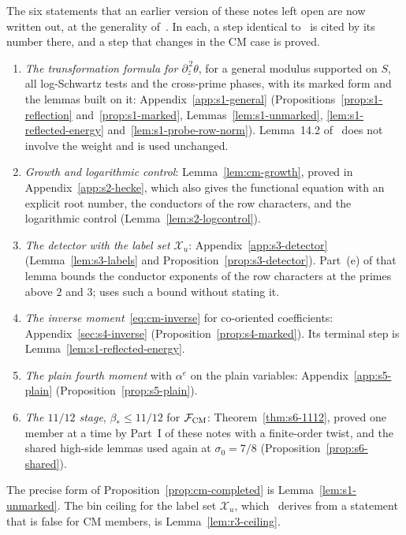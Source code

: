 \documentclass[11pt]{article}
\numberwithin{equation}{section}
\begin{document}
The six statements that an earlier version of these notes left open are now written out, at the
generality of~\cite{OAI78}. In each, a step identical to~\cite{OAI78} is cited by its number there, and a
step that changes in the CM case is proved.
\begin{enumerate}
\item \emph{The transformation formula for $\partial_{\bar z}^{\,2}\theta$}, for a general modulus supported on $S$,
 all log-Schwartz tests and the cross-prime phases, with its marked form and the lemmas built on it:
 Appendix~\ref{app:s1-general} (Propositions~\ref{prop:s1-reflection} and~\ref{prop:s1-marked},
 Lemmas~\ref{lem:s1-unmarked}, \ref{lem:s1-reflected-energy} and~\ref{lem:s1-probe-row-norm}).
 Lemma~14.2 of~\cite{OAI78} does not involve the weight and is used unchanged.
\item \emph{Growth and logarithmic control}: Lemma~\ref{lem:cm-growth}, proved in Appendix~\ref{app:s2-hecke}, which
 also gives the functional equation with an explicit root number, the conductors of the row characters, and the
 logarithmic control (Lemma~\ref{lem:s2-logcontrol}).
\item \emph{The detector with the label set $\mathcal X_u$}: Appendix~\ref{app:s3-detector}
 (Lemma~\ref{lem:s3-labels} and Proposition~\ref{prop:s3-detector}). Part~(e) of that lemma bounds the conductor
 exponents of the row characters at the primes above $2$ and $3$; \cite{OAI78} uses such a bound without stating
 it.
\item \emph{The inverse moment}~\eqref{eq:cm-inverse} for co-oriented coefficients: Appendix~\ref{sec:s4-inverse}
 (Proposition~\ref{prop:s4-marked}). Its terminal step is Lemma~\ref{lem:s1-reflected-energy}.
\item \emph{The plain fourth moment} with $\alpha^e$ on the plain variables: Appendix~\ref{app:s5-plain}
 (Proposition~\ref{prop:s5-plain}).
\item \emph{The $11/12$ stage}, $\beta_*\le11/12$ for $\mathcal F_{\rm CM}$: Theorem~\ref{thm:s6-1112}, proved one
 member at a time by Part~I of these notes with a finite-order twist, and the shared high-side lemmas used again
 at $\sigma_0=7/8$ (Proposition~\ref{prop:s6-shared}).
\end{enumerate}
The precise form of Proposition~\ref{prop:cm-completed} is Lemma~\ref{lem:s1-unmarked}. The bin ceiling for the
label set $\mathcal X_u$, which~\cite{OAI78} derives from a statement that is false for CM members, is
Lemma~\ref{lem:r3-ceiling}.
\end{document}
